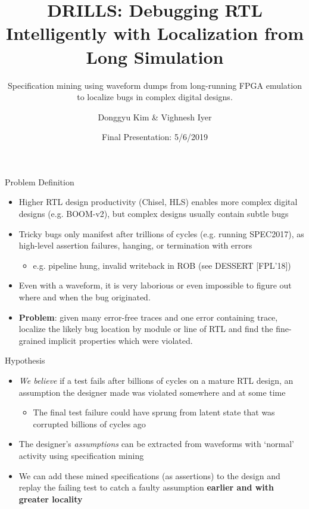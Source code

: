 \documentclass[12pt,aspectratio=169]{beamer}
\title{DRILLS: Debugging RTL Intelligently with Localization from Long Simulation}
\subtitle{{\small Specification mining using waveform dumps from long-running FPGA emulation to localize bugs in complex digital designs.}}
\author{Donggyu Kim \& Vighnesh Iyer}
\date{Final Presentation: 5/6/2019}
\begin{document}
\begin{frame}
    \maketitle
\end{frame}

\begin{frame}{Problem Definition}
  \begin{itemize}
  \setlength\itemsep{0.75em}
    \item Higher RTL design productivity (Chisel, HLS) enables more complex digital designs (e.g. BOOM-v2), but complex designs usually contain subtle bugs
    \item Tricky bugs only manifest after trillions of cycles (e.g. running SPEC2017), as high-level assertion failures, hanging, or termination with errors
    \begin{itemize}
      \setlength\itemsep{0.5em}
      \item {\small e.g. pipeline hung, invalid writeback in ROB (see DESSERT [FPL’18])}
    \end{itemize}
    \item Even with a waveform, it is very laborious or even impossible to figure out where and when the bug originated.
    \item \textbf{Problem}: given many error-free traces and one error containing trace, localize the likely bug location by module or line of RTL and find the fine-grained implicit properties which were violated.
  \end{itemize}
\end{frame}

\begin{frame}{Hypothesis}
  \begin{itemize}
    \setlength\itemsep{0.75em}
    \item \textit{We believe} if a test fails after billions of cycles on a mature RTL design, an assumption the designer made was violated somewhere and at some time
      \begin{itemize}
        \item The final test failure could have sprung from latent state that was corrupted billions of cycles ago
      \end{itemize}
    \item The designer’s \textit{assumptions} can be extracted from waveforms with ‘normal’ activity using specification mining
    \item We can add these mined specifications (as assertions) to the design and replay the failing test to catch a faulty assumption \textbf{earlier and with greater locality}
  \end{itemize}
\end{frame}
\end{document}
